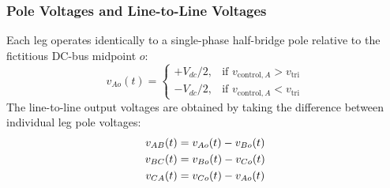 \documentclass[11pt,a4paper]{article}
\begin{document}
\subsubsection{Pole Voltages and Line-to-Line Voltages}
Each leg operates identically to a single-phase half-bridge pole relative to the fictitious DC-bus midpoint $o$:
\begin{equation}
v_{Ao}(t) = \begin{cases} +V_{dc}/2, & \text{if } v_{\text{control},A} > v_{\text{tri}} \\ -V_{dc}/2, & \text{if } v_{\text{control},A} < v_{\text{tri}} \end{cases}
\end{equation}
The line-to-line output voltages are obtained by taking the difference between individual leg pole voltages:
\begin{align}
v_{AB}(t) &= v_{Ao}(t) - v_{Bo}(t) \notag\\
v_{BC}(t) &= v_{Bo}(t) - v_{Co}(t) \notag\\
v_{CA}(t) &= v_{Co}(t) - v_{Ao}(t)
\end{align}
\end{document}
